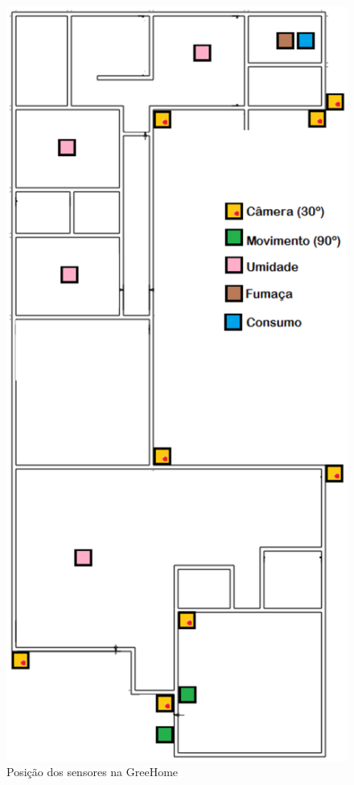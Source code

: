 \begin{figure}[H]
\begin{center}
	\includegraphics[keepaspectratio,scale=0.5,angle=270]{figuras/posicao.eps}
	\caption{Posição dos sensores na GreeHome}
  \end{center}
\end{figure}

